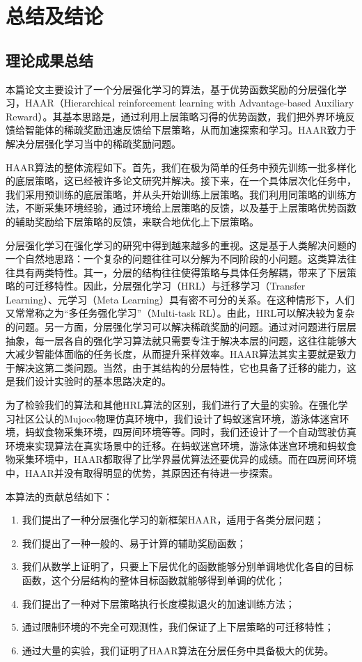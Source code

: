 \chapter{总结及结论}

\section{理论成果总结}
本篇论文主要设计了一个分层强化学习的算法，基于优势函数奖励的分层强化学习，HAAR（Hierarchical reinforcement learning with Advantage-based Auxiliary Reward）。其基本思路是，通过利用上层策略习得的优势函数，我们把外界环境反馈给智能体的稀疏奖励迅速反馈给下层策略，从而加速探索和学习。HAAR致力于解决分层强化学习当中的稀疏奖励问题。

HAAR算法的整体流程如下。首先，我们在极为简单的任务中预先训练一批多样化的底层策略，这已经被许多论文研究并解决。接下来，在一个具体层次化任务中，我们采用预训练的底层策略，并从头开始训练上层策略。我们利用同策略的训练方法，不断采集环境经验，通过环境给上层策略的反馈，以及基于上层策略优势函数的辅助奖励给下层策略的反馈，来联合地优化上下层策略。

分层强化学习在强化学习的研究中得到越来越多的重视。这是基于人类解决问题的一个自然地思路：一个复杂的问题往往可以分解为不同阶段的小问题。这类算法往往具有两类特性。其一，分层的结构往往使得策略与具体任务解耦，带来了下层策略的可迁移特性。因此，分层强化学习（HRL）与迁移学习（Transfer Learning）、元学习（Meta Learning）具有密不可分的关系。在这种情形下，人们又常常称之为``多任务强化学习''（Multi-task RL）。由此，HRL可以解决较为复杂的问题。另一方面，分层强化学习可以解决稀疏奖励的问题。通过对问题进行层层抽象，每一层各自的强化学习算法就只需要专注于解决本层的问题，这往往能够大大减少智能体面临的任务长度，从而提升采样效率。HAAR算法其实主要就是致力于解决这第二类问题。当然，由于其结构的分层特性，它也具备了迁移的能力，这是我们设计实验时的基本思路决定的。

为了检验我们的算法和其他HRL算法的区别，我们进行了大量的实验。在强化学习社区公认的Mujoco物理仿真环境中，我们设计了蚂蚁迷宫环境，游泳体迷宫环境，蚂蚁食物采集环境，四房间环境等等。同时，我们还设计了一个自动驾驶仿真环境来实现算法在真实场景中的迁移。在蚂蚁迷宫环境，游泳体迷宫环境和蚂蚁食物采集环境中，HAAR都取得了比学界最优算法还要优异的成绩。而在四房间环境中，HAAR并没有取得明显的优势，其原因还有待进一步探索。

本算法的贡献总结如下：
\begin{enumerate}
  \item 我们提出了一种分层强化学习的新框架HAAR，适用于各类分层问题；
  \item 我们提出了一种一般的、易于计算的辅助奖励函数；
  \item 我们从数学上证明了，只要上下层优化的函数能够分别单调地优化各自的目标函数，这个分层结构的整体目标函数就能够得到单调的优化；
  \item 我们提出了一种对下层策略执行长度模拟退火的加速训练方法；
  \item 通过限制环境的不完全可观测性，我们保证了上下层策略的可迁移特性；
  \item 通过大量的实验，我们证明了HAAR算法在分层任务中具备极大的优势。
\end{enumerate}

